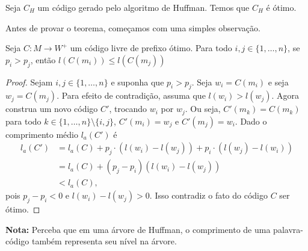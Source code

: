 \begin{theorem}
  \label{thm:otimo_huffman}
  Seja $C_{H}$ um código gerado pelo algoritmo de Huffman. Temos que
  $C_{H}$ é ótimo.
\end{theorem}

Antes de provar o teorema, começamos com uma simples observação.
  
\begin{lemma} \label{lemma:dist_prob_avg_size} Seja $C:M\to W^+$ um código livre de prefixo ótimo. Para todo $i,j \in\{1,\dotsc, n\}$, se $p_i > p_j$, então $l(C(m_i)) \leq l(C(m_j))$
\end{lemma}
  \begin{proof}
    Sejam $i,j \in\{1,\dotsc, n\}$ e suponha que $p_i > p_j$.  Seja
    $w_i = C(m_i)$ e seja $w_j = C(m_j)$. Para efeito de contradição,
    assuma que $l(w_i) > l(w_j)$.  Agora construa um novo código $C'$,
    trocando $w_i$ por $w_j$. Ou seja, $C'(m_k) = C(m_k)$ para todo $k
    \in \{1,\dotsc, n\} \setminus \{i,j\}$, $C'(m_i) = w_j$ e $C'(m_j)
    = w_i$.  Dado o comprimento médio $l_a(C')$ é
 \begin{align*}
   l_a(C') &= l_a(C) + p_j\cdot(l(w_i) - l(w_j)) + p_i\cdot(l(w_j) - l(w_i)) \\
   &= l_a(C) + (p_j - p_i)(l(w_i) - l(w_j))\\
   &< l_a(C),
 \end{align*}
 pois $p_j - p_i < 0$ e $l(w_i) - l(w_j)>0$. Isso contradiz o fato do
 código $C$ ser ótimo.
  \end{proof}

\noindent \textbf{Nota:} Perceba que em uma árvore de Huffman, o
comprimento de uma palavra-código também representa seu nível na árvore.

